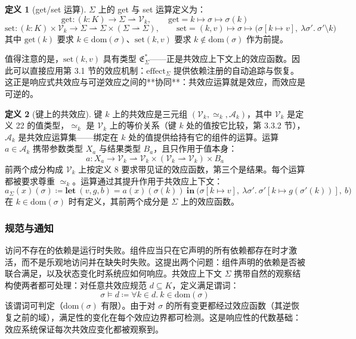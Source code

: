 \documentclass[11pt,a4paper]{article}
\theoremstyle{plain}
\theoremstyle{definition}
\newtheorem{definition}{定义}
\theoremstyle{remark}
\begin{document}
\begin{definition}[get/set 运算]
$\Sigma$ 上的 get 与 set 运算定义为：
\[
\mathrm{get} : (k : K) \to \Sigma \rightharpoonup \mathcal{V}_k, \qquad \mathrm{get} = k \mapsto \sigma \mapsto \sigma(k)
\]
\[
\mathrm{set} : (k : K) \times \mathcal{V}_k \to \Sigma \rightharpoonup \Sigma \times (\Sigma \rightharpoonup \Sigma), \qquad \mathrm{set} = (k, v) \mapsto \sigma \mapsto \big(\sigma[k \mapsto v],\ \lambda \sigma'.\ \sigma' \setminus k\big) \tag{21}
\]
其中 $\mathrm{get}(k)$ 要求 $k \in \mathrm{dom}(\sigma)$、$\mathrm{set}(k, v)$ 要求 $k \notin \mathrm{dom}(\sigma)$ 作为前提。
\end{definition}

值得注意的是，$\mathrm{set}(k, v)$ 具有类型 $\mathfrak{E}_\Sigma^\ast$——正是共效应上下文上的效应函数。因此可以直接应用第 3.1 节的效应机制：$\mathrm{effect}_\Sigma$ 提供依赖注册的自动追踪与恢复。这正是响应式共效应与可逆效应之间的**协同**：共效应运算就是效应，而效应是可逆的。

\begin{definition}[键上的共效应]
键 $k$ 上的共效应是三元组 $(\mathcal{V}_k, \simeq_k, \mathcal{A}_k)$，其中 $\mathcal{V}_k$ 是定义 22 的值类型，$\simeq_k$ 是 $\mathcal{V}_k$ 上的等价关系（键 $k$ 处的值按它比较，第 3.3.2 节），$\mathcal{A}_k$ 是共效应运算集——绑定在 $k$ 处的值提供给持有它的组件的运算。运算 $a \in \mathcal{A}_k$ 携带参数类型 $X_a$ 与结果类型 $B_a$，且只作用于值本身：
\[
a : X_a \to \mathcal{V}_k \rightharpoonup \mathcal{V}_k \times (\mathcal{V}_k \rightharpoonup \mathcal{V}_k) \times B_a \tag{22}
\]
前两个成分构成 $\mathcal{V}_k$ 上按定义 8 要求带见证的效应函数，第三个是结果。每个运算都被要求尊重 $\simeq_k$。运算通过其提升作用于共效应上下文：
\[
a_\Sigma(x)(\sigma) \coloneqq \mathbf{let}\ (v, g, b) = a(x)(\sigma(k))\ \mathbf{in}\ \big(\sigma[k \mapsto v],\ \lambda \sigma'.\ \sigma'[k \mapsto g(\sigma'(k))],\ b\big) \tag{23}
\]
在 $k \in \mathrm{dom}(\sigma)$ 时有定义，其前两个成分是 $\Sigma$ 上的效应函数。
\end{definition}

\subsubsection{规范与通知}

访问不存在的依赖是运行时失败。组件应当只在它声明的所有依赖都存在时才激活，而不是乐观地访问并在缺失时失败。这提出两个问题：组件声明的依赖是否被联合满足，以及状态变化时系统应如何响应。共效应上下文 $\Sigma$ 携带自然的观察结构使两者都可处理：对任意共效应规范 $d \subseteq K$，定义满足谓词：
\[
\sigma \models d \coloneqq \forall k \in d.\ k \in \mathrm{dom}(\sigma) \tag{24}
\]
该谓词可判定（$\mathrm{dom}(\sigma)$ 有限）。由于对 $\sigma$ 的所有变更都经过效应函数（其逆恢复之前的域），满足性的变化在每个效应边界都可检测。这是响应性的代数基础：效应系统保证每次共效应变化都被观察到。
\end{document}
